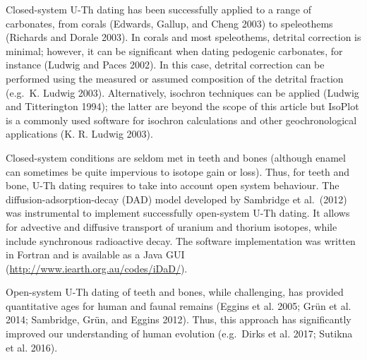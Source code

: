 \documentclass[]{elsarticle} %
\begin{document}
Closed-system U-Th dating has been successfully applied to a range of carbonates, from corals (Edwards, Gallup, and Cheng 2003) to speleothems (Richards and Dorale 2003). In corals and most speleothems, detrital correction is minimal; however, it can be significant when dating pedogenic carbonates, for instance (Ludwig and Paces 2002). In this case, detrital correction can be performed using the measured or assumed composition of the detrital fraction (e.g.~K. Ludwig 2003). Alternatively, isochron techniques can be applied (Ludwig and Titterington 1994); the latter are beyond the scope of this article but IsoPlot is a commonly used software for isochron calculations and other geochronological applications (K. R. Ludwig 2003).

Closed-system conditions are seldom met in teeth and bones (although enamel can sometimes be quite impervious to isotope gain or loss). Thus, for teeth and bone, U-Th dating requires to take into account open system behaviour. The diffusion-adsorption-decay (DAD) model developed by Sambridge et al.~(2012) was instrumental to implement successfully open-system U-Th dating. It allows for advective and diffusive transport of uranium and thorium isotopes, while include synchronous radioactive decay. The software implementation was written in Fortran and is available as a Java GUI (\url{http://www.iearth.org.au/codes/iDaD/}).

Open-system U-Th dating of teeth and bones, while challenging, has provided quantitative ages for human and faunal remains (Eggins et al. 2005; Grün et al. 2014; Sambridge, Grün, and Eggins 2012). Thus, this approach has significantly improved our understanding of human evolution (e.g.~Dirks et al. 2017; Sutikna et al. 2016).
\end{document}
